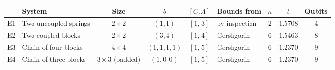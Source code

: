 \begin{tabular}{llccclccc}
\toprule
 & System & Size & $b$ & $[C,\Lambda]$ & Bounds from & $n$ & $t$ & Qubits \\
\midrule
E1 & Two uncoupled springs & $2\times2$ & $(1,1)$ & $[1,\,3]$ & by inspection & 2 & $1.5708$ & 4 \\
E2 & Two coupled blocks & $2\times2$ & $(3,4)$ & $[1,\,4]$ & Gershgorin & 6 & $1.5463$ & 8 \\
E3 & Chain of four blocks & $4\times4$ & $(1,1,1,1)$ & $[1,\,5]$ & Gershgorin & 6 & $1.2370$ & 9 \\
E4 & Chain of three blocks & $3\times3$ (padded) & $(1,0,0)$ & $[1,\,5]$ & Gershgorin & 6 & $1.2370$ & 9 \\
\bottomrule
\end{tabular}
